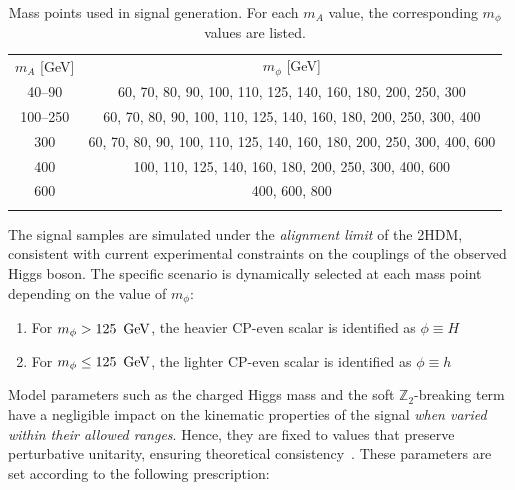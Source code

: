 \begin{table}[!htbp]
\centering
\renewcommand{\arraystretch}{1.5} %
\setlength{\tabcolsep}{12pt} %
\begin{tabular}{cc}
\hline
$m_A$ [GeV] & $m_\phi$ [GeV] \\
\arrayrulecolor{black} \hline

40--90     & 60, 70, 80, 90, 100, 110, 125, 140, 160, 180, 200, 250, 300 \\
\arrayrulecolor{lightgray} \hline

100--250   & 60, 70, 80, 90, 100, 110, 125, 140, 160, 180, 200, 250, 300, 400 \\
\arrayrulecolor{lightgray} \hline

300        & 60, 70, 80, 90, 100, 110, 125, 140, 160, 180, 200, 250, 300, 400, 600 \\
\arrayrulecolor{lightgray} \hline

400        & 100, 110, 125, 140, 160, 180, 200, 250, 300, 400, 600 \\
\arrayrulecolor{lightgray} \hline

600        & 400, 600, 800 \\
\arrayrulecolor{black} \hline

\end{tabular}
\caption{Mass points used in signal generation. For each $m_A$ value, the corresponding $m_\phi$ values are listed.}
\label{Table:Chapter6_4tauMassGrid}
\end{table}

The signal samples are simulated under the \textit{alignment limit} of the \ac{2HDM}, consistent with current experimental constraints on the couplings of the observed Higgs boson. The specific scenario is dynamically selected at each mass point depending on the value of $m_\phi$:
\begin{enumerate}[label=(\roman*)]
    \item For $m_\phi > 125~\,\text{Ge\hspace{-.08em}V}$, the heavier CP-even scalar is identified as $\phi \equiv H$
    \item For $m_\phi \leq 125~\,\text{Ge\hspace{-.08em}V}$, the lighter CP-even scalar is identified as $\phi \equiv h$
\end{enumerate}

Model parameters such as the charged Higgs mass and the soft $\mathbb{Z}_2$-breaking term have a negligible impact on the kinematic properties of the signal \textit{when varied within their allowed ranges}. Hence, they are fixed to values that preserve perturbative unitarity, ensuring theoretical consistency~\cite{TypeX_2HDM}. These parameters are set according to the following prescription:

